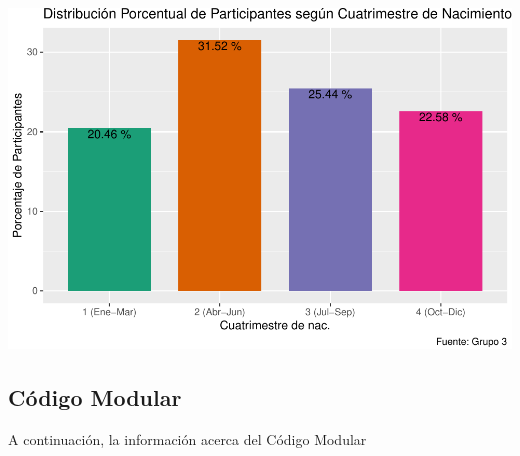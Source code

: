 \documentclass[
]{article}
\begin{document}
\includegraphics{Info_Dinix_02_files/figure-latex/30_QDOB-1.pdf}

\subsection{Código Modular}\label{cuxf3digo-modular}

A continuación, la información acerca del Código Modular
\end{document}
